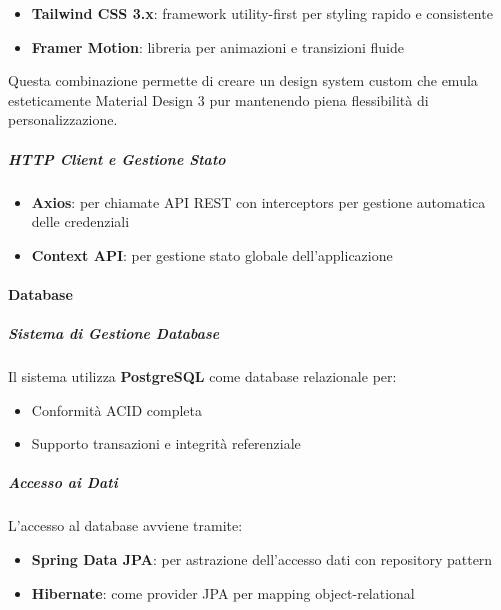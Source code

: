 \begin{itemize}[leftmargin=1.1em]
\item \textbf{Tailwind CSS 3.x}: framework utility-first per styling rapido e consistente
\item \textbf{Framer Motion}: libreria per animazioni e transizioni fluide
\end{itemize}

Questa combinazione permette di creare un design system custom che emula esteticamente Material Design 3 pur mantenendo piena flessibilità di personalizzazione.

\subparagraph{HTTP Client e Gestione Stato}

\begin{itemize}[leftmargin=1.1em]
\item \textbf{Axios}: per chiamate API REST con interceptors per gestione automatica delle credenziali
\item \textbf{Context API}: per gestione stato globale dell'applicazione
\end{itemize}

\paragraph{Database}
\label{subsubsec:database}

\subparagraph{Sistema di Gestione Database}

Il sistema utilizza \textbf{PostgreSQL} come database relazionale per:
\begin{itemize}[leftmargin=1.1em]
\item Conformità ACID completa
\item Supporto transazioni e integrità referenziale
\end{itemize}

\subparagraph{Accesso ai Dati}

L'accesso al database avviene tramite:
\begin{itemize}[leftmargin=1.1em]
\item \textbf{Spring Data JPA}: per astrazione dell'accesso dati con repository pattern
\item \textbf{Hibernate}: come provider JPA per mapping object-relational
\end{itemize}

